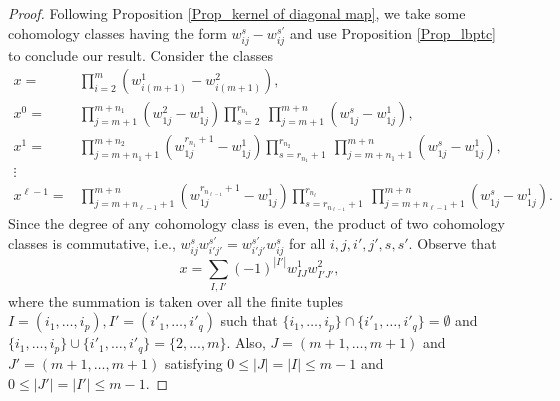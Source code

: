 \documentclass[12pt,oneside,reqno]{amsart}
\theoremstyle{plain}
\theoremstyle{definition}
\theoremstyle{remark}
\begin{document}
\begin{proof}
Following Proposition \ref{Prop_kernel of diagonal map}, we take some cohomology classes having the form $w^s_{ij} - w^{s'}_{ij}$ and use Proposition \ref{Prop_lbptc} to conclude our result.
Consider the classes
\begin{align*}
x = & \prod^m_{i=2}(w^1_{i(m+1)} - w^2_{i(m+1)}),\\
x^0 = & \prod^{m+n_1}_{j=m+1}(w^2_{1j} - w^1_{1j}) \prod^{r_{n_1}}_{s=2} ~\prod^{m+n}_{j=m+1} (w^s_{1j} - w^1_{1j}),\\
x^1 = & \prod^{m+n_2}_{j=m+n_1+1}(w^{r_{n_1}+1}_{1j} - w^1_{1j}) \prod^{r_{n_2}}_{s=r_{n_1}+1} ~\prod^{m+n}_{j=m+ n_1 + 1} (w^s_{1j} - w^1_{1j}),\\
\vdots \\
x^{\ell-1} = & \prod^{m+n}_{j = m+n_{\ell-1}+1}(w^{r_{n_{\ell-1}}+1}_{1j} - w^1_{1j}) \prod^{r_{n_\ell}}_{s=r_{n_{\ell-1}}+1} ~\prod^{m+n}_{j=m+ n_{\ell-1} + 1} (w^s_{1j} - w^1_{1j}).
\end{align*}
Since the degree of any cohomology class is even, the product of two cohomology classes is commutative, i.e., $w^s_{ij} w^{s'}_{i'j'} = w^{s'}_{i'j'} w^s_{ij}$ for all $i,j, i',j',s,s'$. Observe that  
$$x = \sum_{I,I'} (-1)^{|I'|} w^1_{IJ} w^2_{I'J'},$$ where the summation is taken over all the finite tuples $I = (i_1, \ldots , i_p), I' =(i'_1,\ldots, i'_q)$ such that $\{i_1, \ldots, i_p\} \cap \{i'_1, \ldots, i'_q\} = \emptyset$ and  $\{i_1, \ldots, i_p\} \cup \{i'_1, \ldots, i'_q\} = \{2,...,m\}$. Also, $J=(m+1, \ldots, m+1)$ and $J'=(m+1, \ldots, m+1)$ satisfying $0\leq |J|=|I|\leq m-1$ and $0\leq |J'|=|I'| \leq m-1 $.  



\end{proof}
\end{document}
